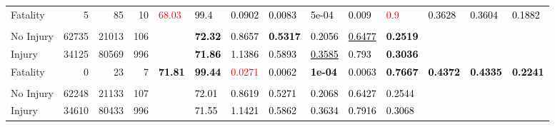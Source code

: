 \documentclass[]{elsarticle} %
\begin{document}
\begin{table}
{{\begin{tabular}[t]{lrrrllllllllll}
Fatality & 5 & 85 & 10 & \multirow{-3}{*}{\raggedright\arraybackslash \textcolor{red}{68.03}} & \textcolor{black}{99.4} & \textcolor{black}{0.0902} & \textcolor{black}{0.0083} & \textcolor{black}{5e-04} & \textcolor{black}{0.009} & \textcolor{red}{0.9} & \multirow{-3}{*}{\raggedright\arraybackslash \textcolor{black}{0.3628}} & \multirow{-3}{*}{\raggedright\arraybackslash \textcolor{black}{0.3604}} & \multirow{-3}{*}{\raggedright\arraybackslash \textcolor{black}{0.1882}}\\
\cmidrule{1-14}
\addlinespace[0.3em]
\multicolumn{14}{l}{\textbf{Model 2}}\\
\hspace{1em}No Injury & 62735 & 21013 & 106 &  & \textcolor{black}{\textbf{72.32}} & \textcolor{black}{0.8657} & \textcolor{black}{\textbf{0.5317}} & \textcolor{black}{0.2056} & \textcolor{black}{\underline{0.6477}} & \textcolor{black}{\textbf{0.2519}} &  &  & \\

\hspace{1em}Injury & 34125 & 80569 & 996 &  & \textcolor{black}{\textbf{71.86}} & \textcolor{black}{1.1386} & \textcolor{black}{0.5893} & \textcolor{black}{\underline{0.3585}} & \textcolor{black}{0.793} & \textcolor{black}{\textbf{0.3036}} &  &  & \\

Fatality & 0 & 23 & 7 & \multirow{-3}{*}{\raggedright\arraybackslash \textcolor{black}{\textbf{71.81}}} & \textcolor{black}{\textbf{99.44}} & \textcolor{red}{0.0271} & \textcolor{black}{0.0062} & \textcolor{black}{\textbf{1e-04}} & \textcolor{black}{0.0063} & \textcolor{black}{\textbf{0.7667}} & \multirow{-3}{*}{\raggedright\arraybackslash \textcolor{black}{\textbf{0.4372}}} & \multirow{-3}{*}{\raggedright\arraybackslash \textcolor{black}{\textbf{0.4335}}} & \multirow{-3}{*}{\raggedright\arraybackslash \textcolor{black}{\textbf{0.2241}}}\\
\cmidrule{1-14}
\addlinespace[0.3em]
\multicolumn{14}{l}{\textbf{Model 3}}\\
\hspace{1em}No Injury & 62248 & 21133 & 107 &  & \textcolor{black}{72.01} & \textcolor{black}{0.8619} & \textcolor{black}{0.5271} & \textcolor{black}{0.2068} & \textcolor{black}{0.6427} & \textcolor{black}{0.2544} &  &  & \\

\hspace{1em}Injury & 34610 & 80433 & 996 &  & \textcolor{black}{71.55} & \textcolor{black}{1.1421} & \textcolor{black}{0.5862} & \textcolor{black}{0.3634} & \textcolor{black}{0.7916} & \textcolor{black}{0.3068} &  &  & \\


\end{tabular}}}
\end{table}
\end{document}

